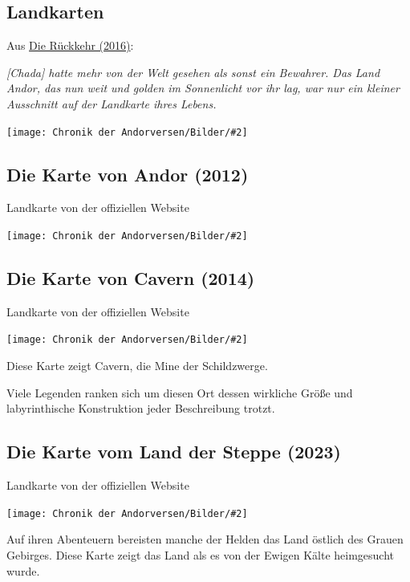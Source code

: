 \documentclass[10pt, a4paper, oneside]{book}
\newcommand{\produkt}[1]{%
    \section{#1}%
    \label{Produkt: #1}%
}
\newcommand{\refstorytext}[1]{\hyperref[Storytext: #1]{#1}}
\newcommand{\bildmitts}[2][height=0.32\textwidth,width=0.48\textwidth,keepaspectratio]{%
    \begin{center}
        \texttt{[image: Chronik der Andorversen/Bilder/\#2]}
    \end{center}
}
\begin{document}
\begin{multicols}{2}
    \begin{chapterbox}
        \chapter{Landkarten}
    
        \begin{center}
            Aus \refstorytext{Die Rückkehr (2016)}:
        \end{center}
    
        \textit{[Chada] hatte mehr von der Welt gesehen als sonst ein Bewahrer. Das Land Andor, das nun weit und golden im Sonnenlicht vor ihr lag, war nur ein kleiner Ausschnitt auf der Landkarte ihres Lebens.}

        \bildmitts[width=0.75\textwidth]{Andor Landkarte LdK.jpg}
    \end{chapterbox}
\end{multicols}






\produkt{Die Karte von Andor (2012)}

\begin{center}
    Landkarte von der offiziellen Website
\end{center}

\bildmitts[width=\textwidth]{Die Karte von Andor.jpg}


\newpage
\produkt{Die Karte von Cavern (2014)}

\begin{center}
    Landkarte von der offiziellen Website
\end{center}

\bildmitts[width=\textwidth]{Die Karte von Cavern.jpg}

Diese Karte zeigt Cavern, die Mine der Schildzwerge.

Viele Legenden ranken sich um diesen Ort dessen wirkliche Größe und labyrinthische Konstruktion jeder Beschreibung trotzt.


\newpage
\produkt{Die Karte vom Land der Steppe (2023)}

\begin{center}
    Landkarte von der offiziellen Website
\end{center}

\bildmitts[width=\textwidth]{Die Karte vom Land der Steppe.jpg}


Auf ihren Abenteuern bereisten manche der Helden das Land östlich des Grauen Gebirges. Diese Karte zeigt das Land als es von der Ewigen Kälte heimgesucht wurde.
\end{document}
